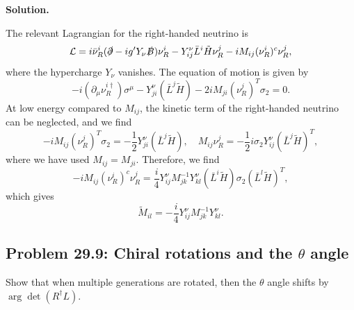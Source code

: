 \documentclass[a4paper,11pt]{article}
\newenvironment{solution}{\par\medskip\noindent\textbf{Solution.}\par\smallskip}{\par\medskip}
\begin{document}
\begin{solution}
    The relevant Lagrangian for the right-handed neutrino is
    \begin{equation}
        \mathcal{L} =i\bar\nu^i_R(\slashed{\partial}-ig'Y_\nu \slashed{B})\nu_R^i - Y_{ij}^\nu\bar L^i\tilde{H}\nu_R^j - iM_{ij}(\nu_R^i)^c\nu_R^j,
    \end{equation}
    where the hypercharge $Y_\nu$ vanishes. The equation of motion is given by
    \begin{equation}
        -i(\partial_\mu \nu_R^{i\dagger})\sigma^\mu  - Y_{ji}^{\nu}(\bar L^j \tilde H) -2iM_{ji}(\nu_R^{j})^T\sigma_2 = 0.
    \end{equation}
    At low energy compared to $M_{ij}$, the kinetic term of the right-handed neutrino can be neglected, and we find
    \begin{equation}
        -iM_{ij}(\nu_R^j)^T\sigma_2 = -\frac{1}{2}Y^\nu_{ji}(\bar L^j\tilde H), \quad M_{ij}\nu_R^j = -\frac{1}{2}i\sigma_2Y^\nu_{ij}(\bar L^j\tilde H)^T,
    \end{equation}
    where we have used $M_{ij} = M_{ji}$.
    Therefore, we find
    \begin{equation}
        -iM_{ij}(\nu_R^i)^c\nu_R^j = \frac{i}{4}Y_{ij}^\nu M^{-1}_{jk}Y_{kl}^\nu(\bar L^i\tilde H) \sigma_2(\bar L^l\tilde H)^T,
    \end{equation}
    which gives
    \begin{equation}
    \boxed{
        \widetilde M_{il} = - \frac{i}{4}Y_{ij}^\nu M^{-1}_{jk}Y_{kl}^\nu.
        }
    \end{equation}

\end{solution}

\subsection[Problem 29.9: Chiral rotations and the \texorpdfstring{$\theta$}{theta} angle]{Problem 29.9: Chiral rotations and the \texorpdfstring{$\theta$}{theta} angle}

Show that when multiple generations are rotated, then the $\theta$ angle shifts
by $\arg\det(R^\dagger L)$.
\end{document}
